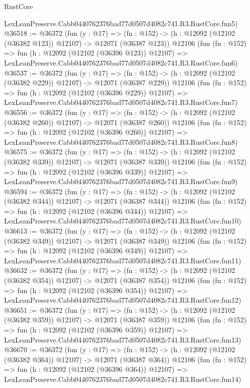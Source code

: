 \begin{lexlean}{RustCore}
\begin{coremodule}
    LexLeanPreserve.Cabb0440762376bad77d0507d4082c741.R3.RustCore.fun5)
@36518 := @36372
    (fun (y : @17) =>
    (fn : @152) -> (h : @12092 (@12102 (@36382 @123)) @12107) -> @12071 (@36387 @123))
    @12106
    (fun (fn : @152) =>
    fun (h : @12092 (@12102 (@36396 @123)) @12107) =>
    LexLeanPreserve.Cabb0440762376bad77d0507d4082c741.R3.RustCore.fun6)
@36537 := @36372
    (fun (y : @17) =>
    (fn : @152) -> (h : @12092 (@12102 (@36382 @229)) @12107) -> @12071 (@36387 @229))
    @12106
    (fun (fn : @152) =>
    fun (h : @12092 (@12102 (@36396 @229)) @12107) =>
    LexLeanPreserve.Cabb0440762376bad77d0507d4082c741.R3.RustCore.fun7)
@36556 := @36372
    (fun (y : @17) =>
    (fn : @152) -> (h : @12092 (@12102 (@36382 @260)) @12107) -> @12071 (@36387 @260))
    @12106
    (fun (fn : @152) =>
    fun (h : @12092 (@12102 (@36396 @260)) @12107) =>
    LexLeanPreserve.Cabb0440762376bad77d0507d4082c741.R3.RustCore.fun8)
@36575 := @36372
    (fun (y : @17) =>
    (fn : @152) -> (h : @12092 (@12102 (@36382 @339)) @12107) -> @12071 (@36387 @339))
    @12106
    (fun (fn : @152) =>
    fun (h : @12092 (@12102 (@36396 @339)) @12107) =>
    LexLeanPreserve.Cabb0440762376bad77d0507d4082c741.R3.RustCore.fun9)
@36594 := @36372
    (fun (y : @17) =>
    (fn : @152) -> (h : @12092 (@12102 (@36382 @344)) @12107) -> @12071 (@36387 @344))
    @12106
    (fun (fn : @152) =>
    fun (h : @12092 (@12102 (@36396 @344)) @12107) =>
    LexLeanPreserve.Cabb0440762376bad77d0507d4082c741.R3.RustCore.fun10)
@36613 := @36372
    (fun (y : @17) =>
    (fn : @152) -> (h : @12092 (@12102 (@36382 @349)) @12107) -> @12071 (@36387 @349))
    @12106
    (fun (fn : @152) =>
    fun (h : @12092 (@12102 (@36396 @349)) @12107) =>
    LexLeanPreserve.Cabb0440762376bad77d0507d4082c741.R3.RustCore.fun11)
@36632 := @36372
    (fun (y : @17) =>
    (fn : @152) -> (h : @12092 (@12102 (@36382 @354)) @12107) -> @12071 (@36387 @354))
    @12106
    (fun (fn : @152) =>
    fun (h : @12092 (@12102 (@36396 @354)) @12107) =>
    LexLeanPreserve.Cabb0440762376bad77d0507d4082c741.R3.RustCore.fun12)
@36651 := @36372
    (fun (y : @17) =>
    (fn : @152) -> (h : @12092 (@12102 (@36382 @359)) @12107) -> @12071 (@36387 @359))
    @12106
    (fun (fn : @152) =>
    fun (h : @12092 (@12102 (@36396 @359)) @12107) =>
    LexLeanPreserve.Cabb0440762376bad77d0507d4082c741.R3.RustCore.fun13)
@36670 := @36372
    (fun (y : @17) =>
    (fn : @152) -> (h : @12092 (@12102 (@36382 @364)) @12107) -> @12071 (@36387 @364))
    @12106
    (fun (fn : @152) =>
    fun (h : @12092 (@12102 (@36396 @364)) @12107) =>
    LexLeanPreserve.Cabb0440762376bad77d0507d4082c741.R3.RustCore.fun14)

\end{coremodule}
\end{lexlean}
